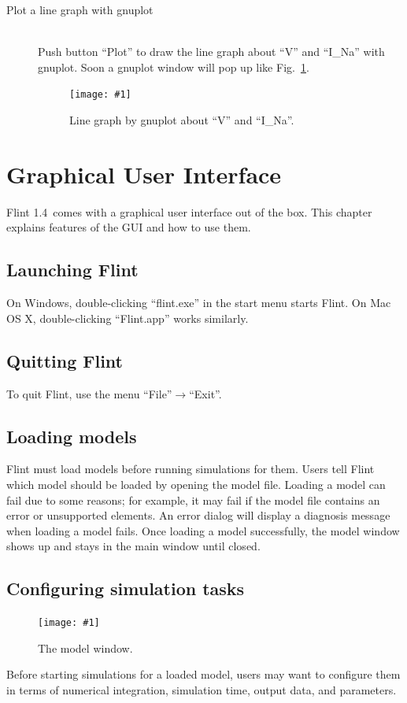 \documentclass[a4paper,10pt]{report}
\def\FlintVersion{1.4}
\def\Flint{Flint \FlintVersion}
\newcommand\FigureOfImage[2]{\begin{figure}[h]
  \centering
  \texttt{[image: \#1]}
  \caption{#2}\label{fig:#1}
\end{figure}}
\begin{document}
\begin{description}
\item[Plot a line graph with gnuplot] \hfill \\
Push button ``Plot'' to draw the line graph about ``V'' and ``I\_Na'' with
gnuplot. Soon a gnuplot window will pop up like Fig.~\ref{fig:hh-gnuplot}.
\FigureOfImage{hh-gnuplot}{Line graph by gnuplot about ``V'' and ``I\_Na''.}
\end{description}



\chapter{Graphical User Interface}
\Flint\ comes with a graphical user interface out of the box. This chapter
explains features of the GUI and how to use them.

\section{Launching Flint}
On Windows, double-clicking ``flint.exe'' in the start menu starts Flint.
On Mac OS X, double-clicking ``Flint.app'' works similarly.

\section{Quitting Flint}
To quit Flint, use the menu ``File''$\rightarrow$``Exit''.

\section{Loading models}
Flint must load models before running simulations for them.
Users tell Flint which model should be loaded by opening the model file.
Loading a model can fail due to some reasons; for example, it may fail if
the model file contains an error or unsupported elements.
An error dialog will display a diagnosis message when loading a model fails.
Once loading a model successfully, the model window shows up and stays
in the main window until closed.

\section{Configuring simulation tasks}
\FigureOfImage{lr}{The model window.}
Before starting simulations for a loaded model, users may want to configure them
in terms of numerical integration, simulation time, output data, and parameters.
\end{document}
